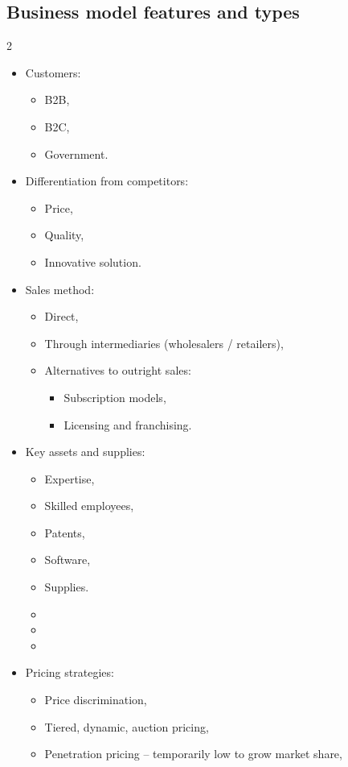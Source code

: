 \documentclass[../notes_compiled.tex]{subfiles}
\begin{document}
\subsection{Business model features and types}
\begin{multicols}{2}
\begin{itemize}
\item Customers:
\begin{itemize}
\item B2B,
\item B2C,
\item Government.
\end{itemize}
\item Differentiation from competitors:
\begin{itemize}
\item Price,
\item Quality,
\item Innovative solution.
\end{itemize}
\item Sales method:
\begin{itemize}
\item Direct,
\item Through intermediaries (wholesalers / retailers),
\item Alternatives to outright sales:
\begin{itemize}
\item Subscription models,
\item Licensing and franchising.
\end{itemize}
\end{itemize}
\item Key assets and supplies:
\begin{itemize}
\item Expertise,
\item Skilled employees,
\item Patents,
\item Software,
\item Supplies.
\item[]
\item[]
\item[]
\end{itemize}
\item Pricing strategies:
\begin{itemize}
\item Price discrimination,
\item Tiered, dynamic, auction pricing,
\item Penetration pricing -- temporarily low to grow market share,

\end{itemize}
\end{itemize}
\end{multicols}
\end{document}
